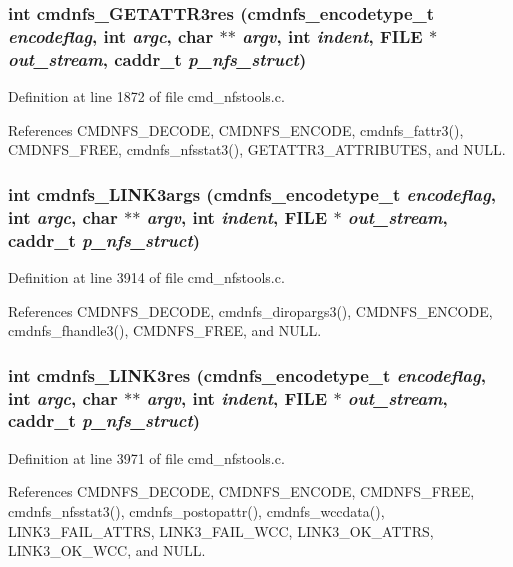 \subsubsection{\setlength{\rightskip}{0pt plus 5cm}int cmdnfs\_\-GETATTR3res ({\bf cmdnfs\_\-encodetype\_\-t} {\em encodeflag}, int {\em argc}, char $\ast$$\ast$ {\em argv}, int {\em indent}, FILE $\ast$ {\em out\_\-stream}, caddr\_\-t {\em p\_\-nfs\_\-struct})}\label{cmd__nfstools_8c_a84}




Definition at line 1872 of file cmd\_\-nfstools.c.

References CMDNFS\_\-DECODE, CMDNFS\_\-ENCODE, cmdnfs\_\-fattr3(), CMDNFS\_\-FREE, cmdnfs\_\-nfsstat3(), GETATTR3\_\-ATTRIBUTES, and NULL.
\subsubsection{\setlength{\rightskip}{0pt plus 5cm}int cmdnfs\_\-LINK3args ({\bf cmdnfs\_\-encodetype\_\-t} {\em encodeflag}, int {\em argc}, char $\ast$$\ast$ {\em argv}, int {\em indent}, FILE $\ast$ {\em out\_\-stream}, caddr\_\-t {\em p\_\-nfs\_\-struct})}\label{cmd__nfstools_8c_a113}




Definition at line 3914 of file cmd\_\-nfstools.c.

References CMDNFS\_\-DECODE, cmdnfs\_\-diropargs3(), CMDNFS\_\-ENCODE, cmdnfs\_\-fhandle3(), CMDNFS\_\-FREE, and NULL.
\subsubsection{\setlength{\rightskip}{0pt plus 5cm}int cmdnfs\_\-LINK3res ({\bf cmdnfs\_\-encodetype\_\-t} {\em encodeflag}, int {\em argc}, char $\ast$$\ast$ {\em argv}, int {\em indent}, FILE $\ast$ {\em out\_\-stream}, caddr\_\-t {\em p\_\-nfs\_\-struct})}\label{cmd__nfstools_8c_a114}




Definition at line 3971 of file cmd\_\-nfstools.c.

References CMDNFS\_\-DECODE, CMDNFS\_\-ENCODE, CMDNFS\_\-FREE, cmdnfs\_\-nfsstat3(), cmdnfs\_\-postopattr(), cmdnfs\_\-wccdata(), LINK3\_\-FAIL\_\-ATTRS, LINK3\_\-FAIL\_\-WCC, LINK3\_\-OK\_\-ATTRS, LINK3\_\-OK\_\-WCC, and NULL.
